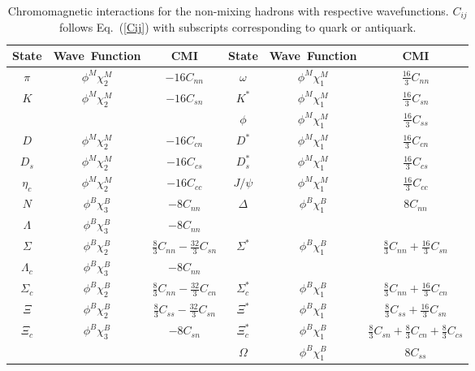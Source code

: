 \documentclass[12pt,onecolumn,floatfix,nofootinbib]{revtex4}
\begin{document}
\renewcommand{\tabcolsep}{0.14cm} \renewcommand{\arraystretch}{1.5}
\begin{table}[!htb]
\caption{Chromomagnetic interactions for the non-mixing hadrons with
respective wavefunctions. $C_{ij}$ follows Eq.~(\protect\ref{Cij}) with
subscripts corresponding to quark or antiquark.}
\label{tab:CMI}%
\begin{tabular}{cccccc}
\hline\hline
\textrm{State} & \textrm{Wave\ Function} & \textrm{CMI} & \textrm{State} &
\textrm{Wave\ Function} & \textrm{CMI} \\ \hline
$\pi$ & $\phi^{M}\chi_{2}^{M}$ & $-16C_{nn}$ & $\omega$ & $%
\phi^{M}\chi_{1}^{M}$ & $\frac{16}{3}C_{nn}$ \\
$K$ & $\phi^{M}\chi_{2}^{M}$ & $-16C_{sn}$ & $K^{\ast}$ & $%
\phi^{M}\chi_{1}^{M}$ & $\frac{16}{3}C_{sn}$ \\
&  &  & $\phi$ & $\phi^{M}\chi_{1}^{M}$ & $\frac{16}{3}C_{ss}$ \\
$D$ & $\phi^{M}\chi_{2}^{M}$ & $-16C_{cn}$ & $D^{\ast}$ & $%
\phi^{M}\chi_{1}^{M}$ & $\frac{16}{3}C_{cn}$ \\
$D_{s}$ & $\phi^{M}\chi_{2}^{M}$ & $-16C_{cs}$ & $D_{s}^{\ast}$ & $%
\phi^{M}\chi_{1}^{M}$ & $\frac{16}{3}C_{cs}$ \\
$\eta_{c}$ & $\phi^{M}\chi_{2}^{M}$ & $-16C_{cc}$ & $J/\psi$ & $%
\phi^{M}\chi_{1}^{M}$ & $\frac{16}{3}C_{cc}$ \\
$N$ & $\phi^{B}\chi_{3}^{B}$ & $-8C_{nn}$ & $\Delta$ & $\phi^{B}\chi_{1}^{B}$
& $8C_{nn}$ \\
$\Lambda$ & $\phi^{B}\chi_{3}^{B}$ & $-8C_{nn}$ &  &  &  \\
$\Sigma$ & $\phi^{B}\chi_{2}^{B}$ & $\frac{8}{3}C_{nn}-\frac{32}{3}C_{sn}$ &
$\Sigma^{\ast}$ & $\phi^{B}\chi_{1}^{B}$ & $\frac{8}{3}C_{nn}+\frac{16}{3}%
C_{sn}$ \\
$\Lambda_{c}$ & $\phi^{B}\chi_{3}^{B}$ & $-8C_{nn}$ &  &  &  \\
$\Sigma_{c}$ & $\phi^{B}\chi_{2}^{B}$ & $\frac{8}{3}C_{nn}-\frac{32}{3}%
C_{cn} $ & $\Sigma_{c}^{\ast}$ & $\phi^{B}\chi_{1}^{B}$ & $\frac{8}{3}C_{nn}+%
\frac{16}{3}C_{cn}$ \\
$\Xi$ & $\phi^{B}\chi_{2}^{B}$ & $\frac{8}{3}C_{ss}-\frac{32}{3}C_{sn}$ & $%
\Xi^{\ast}$ & $\phi^{B}\chi_{1}^{B}$ & $\frac{8}{3}C_{ss}+\frac{16}{3}C_{sn}$
\\
$\Xi_{c}$ & $\phi^{B}\chi_{3}^{B}$ & $-8C_{sn}$ & $\Xi_{c}^{\ast}$ & $%
\phi^{B}\chi_{1}^{B}$ & $\frac{8}{3}C_{sn}+\frac{8}{3}C_{cn}+\frac{8}{3}%
C_{cs}$ \\
&  &  & $\Omega$ & $\phi^{B}\chi_{1}^{B}$ & $8C_{ss}$ \\

\end{tabular}
\end{table}
\end{document}
